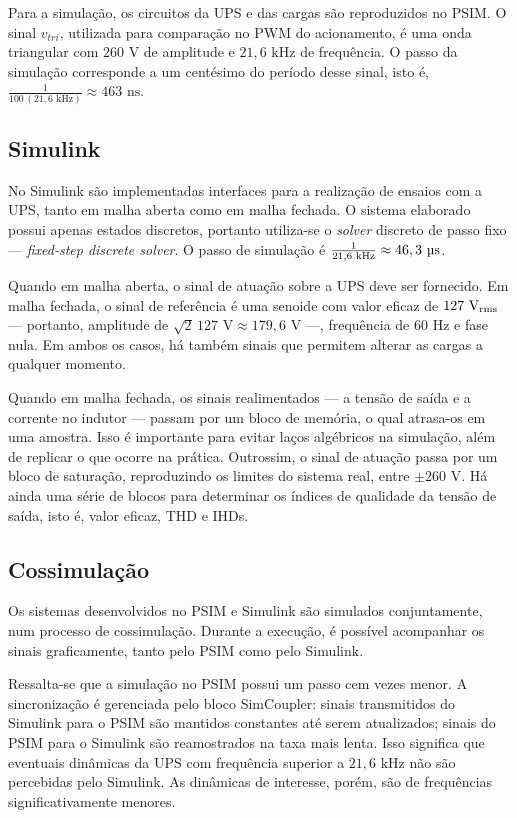 \documentclass[repeatfields,oneside]{tcc}
\newcommand{\mycdot}{ \, }
\begin{document}
Para a simulação, os circuitos da UPS e das cargas são reproduzidos no PSIM.
O sinal $v_{tri}$, utilizada para comparação no PWM do acionamento, é uma onda triangular com $260 \text{ V}$ de amplitude e $21,6 \text{ kHz}$ de frequência.
O passo da simulação corresponde a um centésimo do período desse sinal, isto é, $\frac{1}{ 100 \mycdot \left( 21,6 \text{ kHz} \right) } \approx 463 \text { ns}$.

\subsection{Simulink}

No Simulink são implementadas interfaces para a realização de ensaios com a UPS, tanto em malha aberta como em malha fechada.
O sistema elaborado possui apenas estados discretos, portanto utiliza-se o \textit{solver} discreto de passo fixo --- \textit{fixed-step discrete solver}.
O passo de simulação é $\frac{1}{ 21,6 \text{ kHz} } \approx 46,3 \text { \textmu s}$.

Quando em malha aberta, o sinal de atuação sobre a UPS deve ser fornecido.
Em malha fechada, o sinal de referência é uma senoide com valor eficaz de $127 \text{ V\textsubscript{rms}}$ --- portanto, amplitude de $\sqrt{2} \mycdot 127 \text{ V} \approx  179,6 \text{ V}$ ---, frequência de $60 \text{ Hz}$ e fase nula.
Em ambos os casos, há também sinais que permitem alterar as cargas a qualquer momento.

Quando em malha fechada, os sinais realimentados --- a tensão de saída e a corrente no indutor --- passam por um bloco de memória, o qual atrasa-os em uma amostra.
Isso é importante para evitar laços algébricos na simulação, além de replicar o que ocorre na prática.
Outrossim, o sinal de atuação passa por um bloco de saturação, reproduzindo os limites do sistema real, entre $\pm 260 \text{ V}$.
Há ainda uma série de blocos para determinar os índices de qualidade da tensão de saída, isto é, valor eficaz, THD e IHDs.

\subsection{Cossimulação}

Os sistemas desenvolvidos no PSIM e Simulink são simulados conjuntamente, num processo de cossimulação.
Durante a execução, é possível acompanhar os sinais graficamente, tanto pelo PSIM como pelo Simulink.

Ressalta-se que a simulação no PSIM possui um passo cem vezes menor.
A sincronização é gerenciada pelo bloco SimCoupler: sinais transmitidos do Simulink para o PSIM são mantidos constantes até serem atualizados; sinais do PSIM para o Simulink são reamostrados na taxa mais lenta.
Isso significa que eventuais dinâmicas da UPS com frequência superior a $21,6 \text{ kHz}$ não são percebidas pelo Simulink.
As dinâmicas de interesse, porém, são de frequências significativamente menores.
\end{document}
